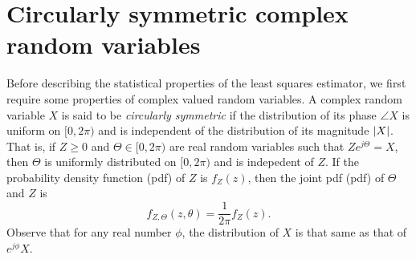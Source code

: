 \documentclass[conference]{IEEEtran}
\begin{document}




\section{Circularly symmetric complex random variables}\label{sec:circ-symm-compl}

Before describing the statistical properties of the least squares estimator, we first require some properties of complex valued random variables.  A complex random variable $X$ is said to be \emph{circularly symmetric} if the distribution of its phase $\angle{X}$ is uniform on $[0,2\pi)$ and is independent of the distribution of its magnitude ${\left\vert X \right\vert}$.  That is, if $Z \geq 0$ and $\Theta \in [0,2\pi)$ are real random variables such that $Ze^{j\Theta} = X$, then $\Theta$ is uniformly distributed on $[0,2\pi)$ and is indepedent of $Z$.  If the probability density function (pdf) of $Z$ is $f_Z(z)$, then the joint pdf (pdf) of $\Theta$ and $Z$ is 
\[
f_{Z,\Theta}(z,\theta) = \frac{1}{2\pi}f_Z(z).
\]  
Observe that for any real number $\phi$, the distribution of $X$ is that same as that of $e^{j\phi}X$.  %
\end{document}
